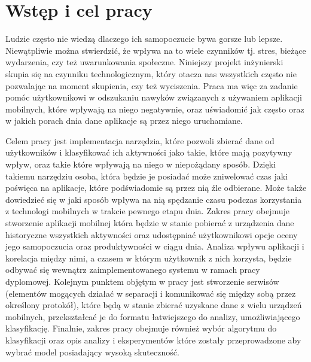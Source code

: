 \documentclass[a4paper,twoside,12pt]{book}
\newcounter{stronyPozaNumeracja}
\begin{document}
\vfill

 

\cleardoublepage


\pagestyle{tylkoNumeryStron}
\tableofcontents

\setcounter{stronyPozaNumeracja}{\value{page}}
\mainmatter
\pagestyle{NumeryStronNazwyRozdzialow}


\chapter{Wstęp i cel pracy}
\label{chap:intro}

Ludzie często nie wiedzą dlaczego ich samopoczucie bywa gorsze lub lepsze. Niewątpliwie można stwierdzić, że wpływa na to wiele czynników tj. stres, bieżące wydarzenia, czy też uwarunkowania społeczne. Niniejszy projekt inżynierski skupia się na czynniku technologicznym, który otacza nas wszystkich często nie pozwalając na moment skupienia, czy też wyciszenia. Praca ma więc za zadanie pomóc użytkownikowi w odszukaniu nawyków związanych z używaniem aplikacji mobilnych, które wpływają na niego negatywnie, oraz uświadomić jak często oraz w jakich porach dnia dane aplikacje są przez niego uruchamiane.     

Celem pracy jest implementacja narzędzia, które pozwoli zbierać dane od użytkowników i klasyfikować ich aktywności jako takie, które mają pozytywny wpływ, oraz takie które wpływają na niego w niepożądany sposób. Dzięki takiemu narzędziu osoba, która będzie je posiadać może zniwelować czas jaki poświęca na aplikacje, które podświadomie są przez nią źle odbierane. Może także dowiedzieć się w jaki sposób wpływa na nią spędzanie czasu podczas korzystania z technologi mobilnych w trakcie pewnego etapu dnia.
Zakres pracy obejmuje stworzenie aplikacji mobilnej która będzie w stanie pobierać z urządzenia dane historyczne wszystkich aktywności oraz udostępniać użytkownikowi opcje oceny jego samopoczucia oraz produktywności w ciągu dnia. Analiza wpływu aplikacji i korelacja między nimi, a czasem w którym użytkownik z nich korzysta, będzie odbywać się wewnątrz zaimplementowanego systemu w ramach pracy dyplomowej. Kolejnym punktem objętym w pracy jest stworzenie serwisów (elementów mogących działać w separacji i komunikować się między sobą przez określony protokół), które będą w stanie zbierać uzyskane dane z wielu urządzeń mobilnych, przekształcać je do formatu łatwiejszego do analizy, umożliwiającego klasyfikację. Finalnie, zakres pracy obejmuje również wybór algorytmu do klasyfikacji oraz opis analizy i eksperymentów które zostały przeprowadzone aby wybrać model posiadający wysoką skuteczność. 
\end{document}
